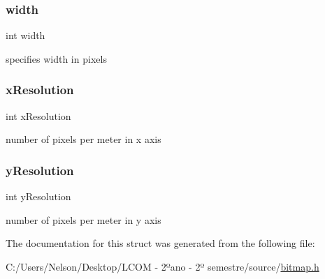 \subsubsection{\texorpdfstring{width}{width}}
{\footnotesize\ttfamily int width}

specifies width in pixels \mbox{\label{struct_bitmap_info_header_ac6eaeb4c0876cf6cd899f41fe3c25ff5}} 
\subsubsection{\texorpdfstring{x\+Resolution}{xResolution}}
{\footnotesize\ttfamily int x\+Resolution}

number of pixels per meter in x axis \mbox{\label{struct_bitmap_info_header_aa2f350dd0bda750656d5db5f5e37b2b3}} 
\subsubsection{\texorpdfstring{y\+Resolution}{yResolution}}
{\footnotesize\ttfamily int y\+Resolution}

number of pixels per meter in y axis 

The documentation for this struct was generated from the following file\+:\begin{DoxyCompactItemize}
\item 
C\+:/\+Users/\+Nelson/\+Desktop/\+L\+C\+O\+M -\/ 2ºano -\/ 2º semestre/source/\hyperlink{bitmap_8h}{bitmap.\+h}\end{DoxyCompactItemize}
